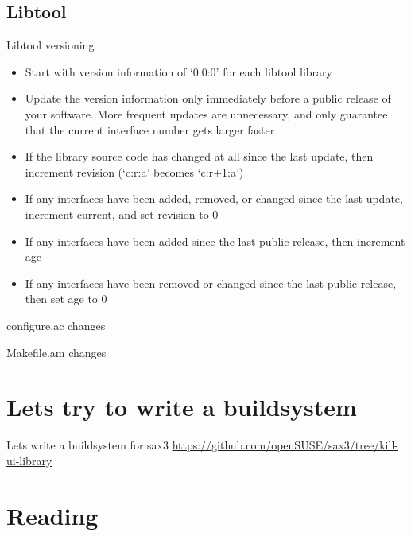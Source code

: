 \documentclass{beamer}
\begin{document}
\subsection{Libtool}

\begin{frame}{Libtool versioning}
	\begin{itemize}
	\item Start with version information of ‘0:0:0’ for each libtool library
	\item Update the version information only immediately before a public release of your software. More frequent updates are unnecessary, and only guarantee that the current interface number gets larger faster
	\item If the library source code has changed at all since the last update, then increment revision (‘c:r:a’ becomes ‘c:r+1:a’)
	\item If any interfaces have been added, removed, or changed since the last update, increment current, and set revision to 0
	\item If any interfaces have been added since the last public release, then increment age
	\item If any interfaces have been removed or changed since the last public release, then set age to 0
	\end{itemize}
\end{frame}

\begin{frame}[t]{configure.ac changes}
	\begin{small}
	
	\end{small}
\end{frame}

\begin{frame}[t]{Makefile.am changes}
	\begin{small}
	
	\end{small}
\end{frame}

\section{Lets try to write a buildsystem}

\begin{frame}{Lets write a buildsystem for sax3}
\url{https://github.com/openSUSE/sax3/tree/kill-ui-library}
\end{frame}

\section{Reading}
\end{document}

